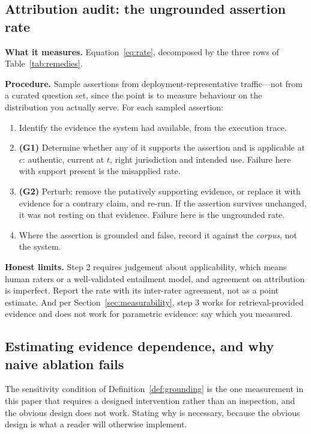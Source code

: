 \subsection{Attribution audit: the ungrounded assertion rate}
\label{sec:measure-rate}

\textbf{What it measures.} Equation~\eqref{eq:rate}, decomposed by the three rows
of Table~\ref{tab:remedies}.

\textbf{Procedure.} Sample assertions from deployment-representative traffic---not
from a curated question set, since the point is to measure behaviour on the
distribution you actually serve. For each sampled assertion:

\begin{enumerate}
  \item Identify the evidence the system had available, from the execution trace.
  \item \textbf{(G1)} Determine whether any of it supports the assertion and is
        applicable at $c$: authentic, current at $t$, right jurisdiction and
        intended use. Failure here with support present is the misapplied rate.
  \item \textbf{(G2)} Perturb: remove the putatively supporting evidence, or
        replace it with evidence for a contrary claim, and re-run. If the
        assertion survives unchanged, it was not resting on that evidence.
        Failure here is the ungrounded rate.
  \item Where the assertion is grounded and false, record it against the
        \emph{corpus}, not the system.
\end{enumerate}

\textbf{Honest limits.} Step 2 requires judgement about applicability, which means
human raters or a well-validated entailment model, and agreement on attribution is
imperfect. Report the rate with its inter-rater agreement, not as a point estimate.
And per Section~\ref{sec:measurability}, step 3 works for retrieval-provided
evidence and does not work for parametric evidence: say which you measured.

\subsection{Estimating evidence dependence, and why naive ablation fails}
\label{sec:sensitivity-protocol}

The sensitivity condition of Definition~\ref{def:grounding} is the one measurement in
this paper that requires a designed intervention rather than an inspection, and the
obvious design does not work. Stating why is necessary, because the obvious design is
what a reader will otherwise implement.

